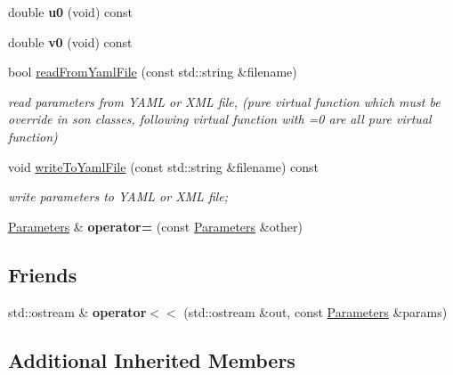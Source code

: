 \begin{DoxyCompactItemize}
double {\bfseries u0} (void) const
\item 
\mbox{\label{classcamodocal_1_1CataCamera_1_1Parameters_a1a1bce91a03bdf052560673570cbabda}} 
double {\bfseries v0} (void) const
\item 
bool \hyperlink{classcamodocal_1_1CataCamera_1_1Parameters_a756399dd928f1a0a9b0eb7922361939f}{read\+From\+Yaml\+File} (const std\+::string \&filename)
\begin{DoxyCompactList}\small\item\em read parameters from Y\+A\+ML or X\+ML file, (pure virtual function which must be override in son classes, following virtual function with \textquotesingle{}=0\textquotesingle{} are all pure virtual function) \end{DoxyCompactList}\item 
void \hyperlink{classcamodocal_1_1CataCamera_1_1Parameters_a9bd3a31bc31a3f4e1becfbd2bbb43331}{write\+To\+Yaml\+File} (const std\+::string \&filename) const
\begin{DoxyCompactList}\small\item\em write parameters to Y\+A\+ML or X\+ML file; \end{DoxyCompactList}\item 
\mbox{\label{classcamodocal_1_1CataCamera_1_1Parameters_aecc485df3df03a0434a4939b7347c2e0}} 
\hyperlink{classcamodocal_1_1CataCamera_1_1Parameters}{Parameters} \& {\bfseries operator=} (const \hyperlink{classcamodocal_1_1CataCamera_1_1Parameters}{Parameters} \&other)
\end{DoxyCompactItemize}
\subsection*{Friends}
\begin{DoxyCompactItemize}
\item 
\mbox{\label{classcamodocal_1_1CataCamera_1_1Parameters_a392b64d625819770f4efedc75838cc42}} 
std\+::ostream \& {\bfseries operator$<$$<$} (std\+::ostream \&out, const \hyperlink{classcamodocal_1_1CataCamera_1_1Parameters}{Parameters} \&params)
\end{DoxyCompactItemize}
\subsection*{Additional Inherited Members}


